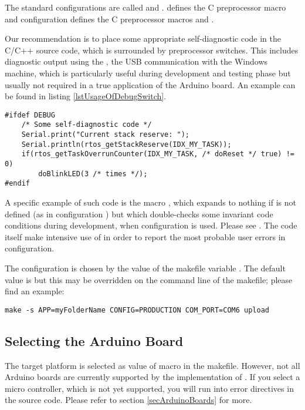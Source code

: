 The standard configurations are called  and
.  defines the C preprocessor macro
 and configuration  defines the C
preprocessor macros  and .

Our recommendation is to place some appropriate self-diagnostic code in
the C/C++ source code, which is surrounded by preprocessor switches. This
includes diagnostic output using the , the USB
communication with the Windows machine, which is particularly useful
during development and testing phase but usually not required in a true
application of the Arduino board. An example can be found in listing
\ref{lstUsageOfDebugSwitch}.
  
\begin{lstlisting}[float, caption={Usage of preprocessor switches
supporting different compile configurations},
label=lstUsageOfDebugSwitch, captionpos=b]
#ifdef DEBUG
    /* Some self-diagnostic code */
    Serial.print("Current stack reserve: ");
    Serial.println(rtos_getStackReserve(IDX_MY_TASK));
    if(rtos_getTaskOverrunCounter(IDX_MY_TASK, /* doReset */ true) != 0)
        doBlinkLED(3 /* times */);
#endif
\end{lstlisting}

A specific example of such code is the macro , which expands
to nothing if  is not defined (as in configuration
) but which double-checks some invariant code conditions
during development, when configuration  is used. Please see
. The \rtos{} code itself make intensive use of
 in order to report the most probable user errors in
 configuration.

The configuration is chosen by the value of the makefile variable .
The default value is  but this may be overridden on the command line
of the makefile; please find an example:

\verb+make -s APP=myFolderName CONFIG=PRODUCTION COM_PORT=COM6 upload+


\subsection{Selecting the Arduino Board}
\label{secMakefileSelectBoard}

The target platform is selected as value of macro
 in the makefile. However, not all Arduino
boards are currently supported by the implementation of \rtos{}. If you
select a micro controller, which is not yet supported, you will run into error
directives in the source code. Please refer to section
\ref{secArduinoBoards} for more.

